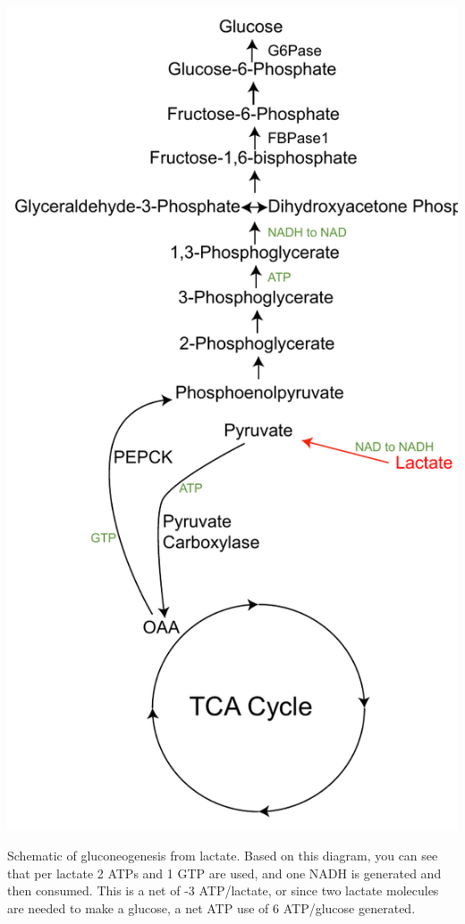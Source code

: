 \documentclass{tufte-handout}
\begin{document}
\begin{marginfigure}
\includegraphics{figures/gluconeogenic-substrates-lactate.pdf}
\caption{Schematic of gluconeogenesis from lactate.  Based on this diagram, you can see that per lactate 2 ATPs and 1 GTP are used, and one NADH is generated and then consumed.  This is a net of -3 ATP/lactate, or since two lactate molecules are needed to make a glucose, a net ATP use of 6 ATP/glucose generated.}
\label{fig:gluconeogenic-substrates-lactate}
\end{marginfigure}
\end{document}
